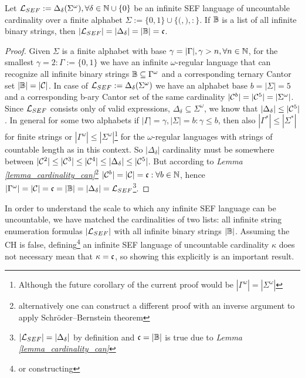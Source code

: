 \begin{theorem}\label{th_cont_card_uncount_sef_lang}
  Let $\mathcal{L}_{SEF} := \Delta_\delta(\Sigma^\omega), \forall \delta \in \mathbb{N} \cup \{0\}$ be an infinite SEF language of uncountable cardinality over a finite alphabet $\Sigma := \{0,1\} \cup \{{(}, {)}, {:}\}$. If $\mathbb{B}$ is a list of all infinite binary strings, then $|\mathcal{L}_{SEF}| = |\Delta_\delta| = |\mathbb{B}| = \mathfrak{c}$.
\end{theorem}
\begin{proof}
  Given $\Sigma$ is a finite alphabet with base $\gamma = |\Gamma|, \gamma > n, \forall n \in \mathbb{N}$, for the smallest $\gamma = 2: \Gamma := \{0,1\}$ we have an infinite $\omega$-regular language that can recognize all infinite binary strings $\mathbb{B} \subseteq \Gamma^\omega$ and a corresponding ternary Cantor set $|\mathbb{B}| = |\mathcal{C}|$. In case of $\mathcal{L}_{SEF} := \Delta_\delta(\Sigma^\omega)$ we have an alphabet base $b = |\Sigma| = 5$ and a corresponding b-ary Cantor set of the same cardinality $|\mathcal{C}^b| = |\mathcal{C}^5| = |\Sigma^\omega|$. Since $\mathcal{L}_{SEF}$ consists only of valid expressions, $\Delta_\delta \subseteq \Sigma^\omega$, we know that $|\Delta_\delta| \leq |\mathcal{C}^5|$.
  In general for some two alphabets if $|\Gamma| = \gamma, |\Sigma| = b: \gamma \leq b$, then also $|\Gamma^*| \leq |\Sigma^*|$ for finite strings or $|\Gamma^\omega| \leq |\Sigma^\omega|$\footnote{Although the future corollary of the current proof would be $|\Gamma^\omega| = |\Sigma^\omega|$} for the $\omega$-regular languages with strings of countable length as in this context. So $|\Delta_\delta|$ cardinality must be somewhere between $|\mathcal{C}^2| \leq |\mathcal{C}^3| \leq |\mathcal{C}^4| \leq |\Delta_\delta| \leq |\mathcal{C}^5|$. But according to \textit{Lemma \ref{lemma_cardinality_can}}\footnote{alternatively one can construct a different proof with an inverse argument to apply Schröder–Bernstein theorem} $|\mathcal{C}^b| = |\mathcal{C}| = \mathfrak{c}: \forall b \in \mathbb{N}$, hence $|\Gamma^\omega| = |\mathcal{C}| = \mathfrak{c} = |\mathbb{B}| = |\Delta_\delta| = \mathcal{L}_{SEF}$\footnote{$|\mathcal{L}_{SEF}| = |\Delta_\delta|$ by definition and $\mathfrak{c} = |\mathbb{B}|$ is true due to \textit{Lemma \ref{lemma_cardinality_can}}}.
\end{proof}

In order to understand the scale to which any infinite SEF language can be uncountable, we have matched the cardinalities of two lists: all infinite string enumeration formulas $|\mathcal{L}_{SEF}|$ with all infinite binary strings $|\mathbb{B}|$. Assuming the CH is false, defining\footnote{or constructing} an infinite SEF language of uncountable cardinality $\kappa$ does not necessary mean that $\kappa = \mathfrak{c}$, so showing this explicitly is an important result.

